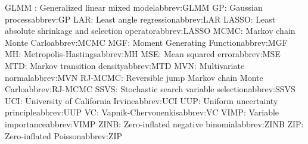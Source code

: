 \begin{tabbing}
\addabbrev GLMM : {\hspace{.4in}Generalized linear mixed model}{abbrev:GLMM}
\addabbrev GP: {\hspace{.4in}Gaussian process}{abbrev:GP}
\addabbrev LAR: {\hspace{.4in}Least angle regression}{abbrev:LAR}
\addabbrev LASSO: {\hspace{.4in}Least absolute shrinkage and selection operator}{abbrev:LASSO}
\addabbrev MCMC: {\hspace{.4in}Markov chain Monte Carlo}{abbrev:MCMC}
\addabbrev MGF: {\hspace{.4in}Moment Generating Function}{abbrev:MGF}
\addabbrev MH: {\hspace{.4in}Metropolis-Hastings}{abbrev:MH}
\addabbrev MSE: {\hspace{.4in}Mean squared error}{abbrev:MSE}
\addabbrev MTD: {\hspace{.4in}Markov transition density}{abbrev:MTD}
\addabbrev MVN: {\hspace{.4in}Multivariate normal}{abbrev:MVN}
\addabbrev RJ-MCMC: {\hspace{.4in}Reversible jump Markov chain Monte Carlo}{abbrev:RJ-MCMC}
\addabbrev SSVS: {\hspace{.4in}Stochastic search variable selection}{abbrev:SSVS}
\addabbrev UCI: {\hspace{.4in}University of California Irvine}{abbrev:UCI}
\addabbrev UUP: {\hspace{.4in}Uniform uncertainty principle}{abbrev:UUP}
\addabbrev VC: {\hspace{.4in}Vapnik-Chervonenkis}{abbrev:VC}
\addabbrev VIMP: {\hspace{.4in}Variable importance}{abbrev:VIMP}
\addabbrev ZINB: {\hspace{.4in}Zero-inflated negative binomial}{abbrev:ZINB}
\addabbrev ZIP: {\hspace{.4in}Zero-inflated Poisson}{abbrev:ZIP}
\end{tabbing}